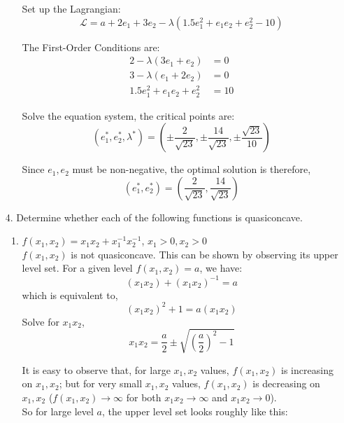 \documentclass{article}
\begin{document}
\begin{enumerate}
\begin{enumerate}
        Set up the Lagrangian:
        $$ \mathcal{L} = a + 2e_1 + 3e_2 - \lambda(1.5e_1^2 + e_1e_2 + e_2^2 - 10) $$
        
        The First-Order Conditions are:
        \begin{align*}
            2 - \lambda(3e_1 + e_2) &= 0 \\
            3 - \lambda(e_1 + 2e_2) &= 0 \\
            1.5e_1^2 + e_1e_2 + e_2^2 &= 10
        \end{align*}
        
        Solve the equation system, the critical points are:
        $$ (e_1^*, e_2^*, \lambda^*) = \left( \pm\frac{2}{\sqrt{23}}, \pm\frac{14}{\sqrt{23}}, \pm\frac{\sqrt{23}}{10} \right) $$
        
        Since $e_1,e_2$ must be non-negative, the optimal solution is therefore, 
        $$ (e_1^*, e_2^*) = \left( \frac{2}{\sqrt{23}}, \frac{14}{\sqrt{23}} \right) $$
    \end{enumerate}
    
    
    \item[4. ] Determine whether each of the following functions is quasiconcave.
        \begin{enumerate}
            \item $f(x_1, x_2) = x_1x_2 + x_1^{-1}x_2^{-1}$, $x_1>0, x_2>0$ \\
            
            $f(x_1,x_2)$ is not quasiconcave. This can be shown by observing its upper level set. 
            For a given level $f(x_1, x_2) = a$, we have:
            $$ (x_1x_2) + (x_1x_2)^{-1} = a $$
            which is equivalent to,
            $$ (x_1x_2)^2 + 1 = a (x_1x_2) $$
            Solve for $x_1x_2$, 
            $$ x_1x_2 = \frac{a}{2} \pm \sqrt{\left( \frac{a}{2} \right)^2 - 1}$$
            
            It is easy to observe that, for large $x_1,x_2$ values, $f(x_1, x_2)$ is increasing on $x_1,x_2$;
            but for very small $x_1,x_2$ values, $f(x_1, x_2)$ is decreasing on $x_1,x_2$ 
            ($f(x_1, x_2) \to \infty$ for both $x_1x_2 \to \infty $ and $x_1x_2 \to 0$). \\
            
            So for large level $a$, the upper level set looks roughly like this:
            \begin{figure}[h]
                \centering
                
            \end{figure}
            

\end{enumerate}
\end{enumerate}
\end{document}
